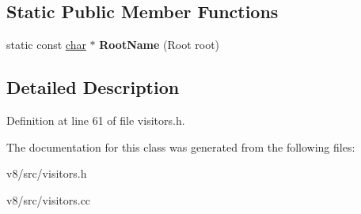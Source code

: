 \subsection*{Static Public Member Functions}
\begin{DoxyCompactItemize}
\item 
\mbox{\label{classv8_1_1internal_1_1RootVisitor_a6a43efc050fa0454ef362997a25420a6}} 
static const \mbox{\hyperlink{classchar}{char}} $\ast$ {\bfseries Root\+Name} (Root root)
\end{DoxyCompactItemize}


\subsection{Detailed Description}


Definition at line 61 of file visitors.\+h.



The documentation for this class was generated from the following files\+:\begin{DoxyCompactItemize}
\item 
v8/src/visitors.\+h\item 
v8/src/visitors.\+cc\end{DoxyCompactItemize}
